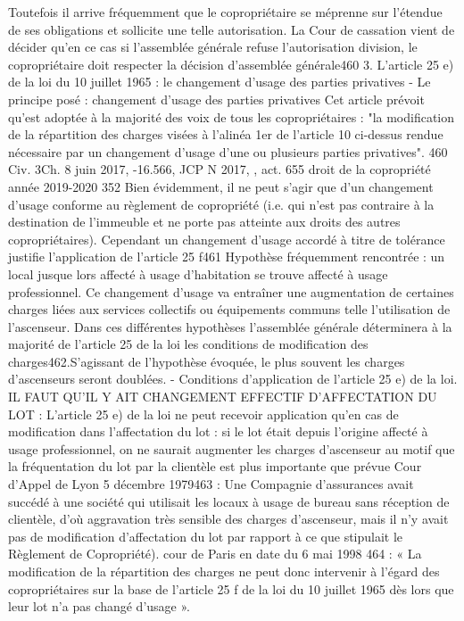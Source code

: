 Toutefois il arrive fréquemment que le copropriétaire se méprenne sur l’étendue de ses obligations et sollicite une telle autorisation. La Cour de cassation vient de décider qu’en ce cas si l’assemblée générale refuse l’autorisation division, le copropriétaire doit respecter la décision d’assemblée générale460
3. L'article 25 e) de la loi du 10 juillet 1965 : le changement d’usage des parties privatives
- Le principe posé : changement d’usage des parties privatives
Cet article prévoit qu'est adoptée à la majorité des voix de tous les copropriétaires :
"la modification de la répartition des charges visées à l'alinéa 1er de l'article 10 ci-dessus rendue nécessaire par un changement d'usage d'une ou plusieurs parties privatives".
460 Civ. 3\degres Ch. 8 juin 2017, -16.566, JCP N 2017, , act. 655
droit de la copropriété année 2019-2020
352
Bien évidemment, il ne peut s'agir que d'un changement d'usage conforme au règlement de copropriété (i.e. qui n'est pas contraire à la destination de l'immeuble et ne porte pas atteinte aux droits des autres copropriétaires). Cependant un changement d’usage accordé à titre de tolérance justifie l’application de l’article 25 f461
Hypothèse fréquemment rencontrée : un local jusque lors affecté à usage d'habitation se trouve affecté à usage professionnel. Ce changement d'usage va entraîner une augmentation de certaines charges liées aux services collectifs ou équipements communs telle l'utilisation de l'ascenseur.
Dans ces différentes hypothèses l'assemblée générale déterminera à la majorité de l'article 25 de la loi les conditions de modification des charges462.S'agissant de l’hypothèse évoquée, le plus souvent les charges d'ascenseurs seront doublées.
- Conditions d'application de l'article 25 e) de la loi.
IL FAUT QU'IL Y AIT CHANGEMENT EFFECTIF D'AFFECTATION DU LOT :
L'article 25 e) de la loi ne peut recevoir application qu'en cas de modification dans l'affectation du lot : si le lot était depuis l'origine affecté à usage professionnel, on ne saurait augmenter les charges d'ascenseur au motif que la fréquentation du lot par la clientèle est plus importante que prévue
Cour d'Appel de Lyon 5 décembre 1979463 :
Une Compagnie d'assurances avait succédé à une société qui utilisait les locaux à usage de bureau sans réception de clientèle, d'où aggravation très sensible des charges d'ascenseur, mais il n'y avait pas de modification d'affectation du lot par rapport à ce que stipulait le Règlement de Copropriété).
cour de Paris en date du 6 mai 1998 464 :
« La modification de la répartition des charges ne peut donc intervenir à l'égard des copropriétaires sur la base de l'article 25 f de la loi du 10 juillet 1965 dès lors que leur lot n'a pas changé d'usage ».
